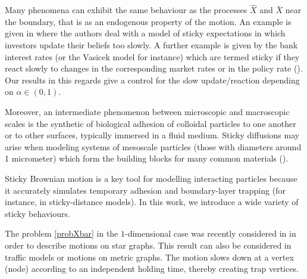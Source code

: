 \documentclass[11pt,a4paper]{article}
\newcommand{\magenta}{black}
\begin{document}
Many phenomena can exhibit the same behaviour as the processes $\hat{X}$ and $\bar{X}$ near the boundary, that is as an endogenous property of the motion. An example is given in \cite{BKLT-financeSticky} where the authors deal with a model of sticky expectations in which investors update their beliefs too slowly. A further example is given by the bank interest rates (or the Vasicek model for instance)  which are termed sticky if they react slowly to changes in the corresponding market rates or in the policy rate (\cite{GNSS-finance-Sticky}). Our results in this regards give a control for the slow update/reaction depending on $\alpha \in (0,1)$.


Moreover, an intermediate phenomenon between microscopic and macroscopic scales is the synthetic of biological adhesion of colloidal particles to one another or to other surfaces, typically immersed in a fluid medium. Sticky diffusions may arise when modeling systems of mesoscale particles (those with diameters around 1 micrometer) which form the building blocks for many common materials (\cite{KBS-bio-sticky}). 

{\color{\magenta} Sticky Brownian motion is a key tool for modelling interacting particles because it accurately simulates temporary adhesion and boundary-layer trapping (for instance, in sticky-distance models). In this work, we introduce a wide variety of sticky behaviours.}

The problem \eqref{probXbar} in the $1$-dimensional case was recently considered in \cite{BonDov} in order to describe motions on star graphs. This result can also be considered in traffic models or motions on metric graphs. The motion slows down at a vertex (node) according to an independent holding time, thereby creating trap vertices. 
\end{document}
